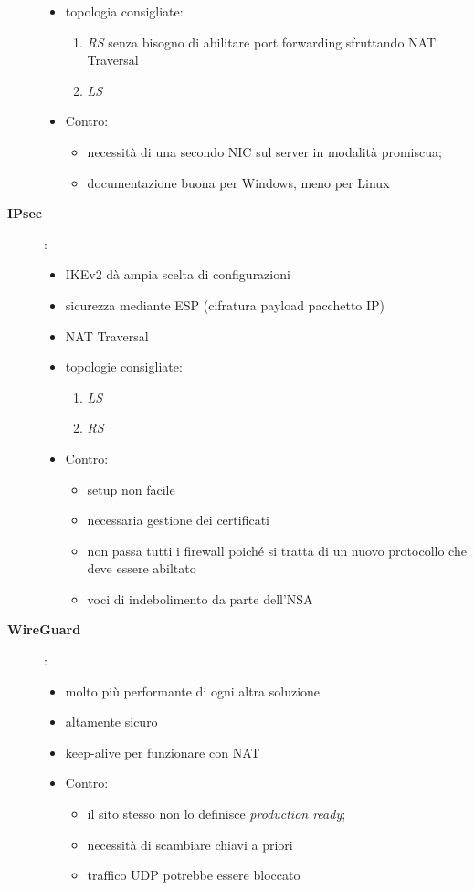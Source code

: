 \begin{description}
\begin{itemize}
      \item topologia consigliate:
      \begin{enumerate}
        \item \textit{RS} senza bisogno di abilitare port forwarding sfruttando
        NAT Traversal
        \item \textit{LS}
      \end{enumerate}
      \item Contro:
      \begin{itemize}
        \item necessità di una secondo NIC sul server in modalità promiscua;
        \item documentazione buona per Windows, meno per Linux
      \end{itemize}
    \end{itemize}
    \item[\textbf{IPsec}]:
    \begin{itemize}
      \item IKEv2 dà ampia scelta di configurazioni
      \item sicurezza mediante ESP (cifratura payload pacchetto IP)
      \item NAT Traversal
      \item topologie consigliate:
      \begin{enumerate}
        \item \textit{LS}
        \item \textit{RS}
      \end{enumerate}
      \item Contro:
      \begin{itemize}
        \item setup non facile
        \item necessaria gestione dei certificati
        \item non passa tutti i firewall poiché si tratta di un nuovo protocollo
        che deve essere abiltato
        \item voci di indebolimento da parte dell'NSA
      \end{itemize}
    \end{itemize}
    \item[\textbf{WireGuard}]:
    \begin{itemize}
      \item molto più performante di ogni altra soluzione
      \item altamente sicuro
      \item keep-alive per funzionare con NAT
      \item Contro:
      \begin{itemize}
        \item il sito stesso non lo definisce \textit{production ready};
        \item necessità di scambiare chiavi a priori
        \item traffico UDP potrebbe essere bloccato
      \end{itemize}
    \end{itemize}
\end{description}
